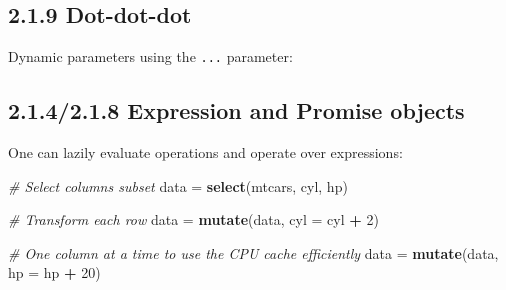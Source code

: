 \documentclass[]{article}
\newenvironment{Shaded}{\begin{snugshade}}{\end{snugshade}}
\newcommand{\CommentTok}[1]{\textcolor[rgb]{0.56,0.35,0.01}{\textit{#1}}}
\newcommand{\DataTypeTok}[1]{\textcolor[rgb]{0.13,0.29,0.53}{#1}}
\newcommand{\DecValTok}[1]{\textcolor[rgb]{0.00,0.00,0.81}{#1}}
\newcommand{\KeywordTok}[1]{\textcolor[rgb]{0.13,0.29,0.53}{\textbf{#1}}}
\newcommand{\NormalTok}[1]{#1}
\newcommand{\OperatorTok}[1]{\textcolor[rgb]{0.81,0.36,0.00}{\textbf{#1}}}
\newcommand{\StringTok}[1]{\textcolor[rgb]{0.31,0.60,0.02}{#1}}
\begin{document}
\hypertarget{dot-dot-dot}{%
\subsection{2.1.9 Dot-dot-dot}\label{dot-dot-dot}}

Dynamic parameters using the \texttt{...} parameter:

\begin{Shaded}
\end{Shaded}

\hypertarget{expression-and-promise-objects}{%
\subsection{2.1.4/2.1.8 Expression and Promise
objects}\label{expression-and-promise-objects}}

One can lazily evaluate operations and operate over expressions:

\begin{Shaded}
\begin{Highlighting}[]
\CommentTok{# Select columns subset}
\NormalTok{data =}\StringTok{ }\KeywordTok{select}\NormalTok{(mtcars, cyl, hp)}

\CommentTok{# Transform each row}
\NormalTok{data =}\StringTok{ }\KeywordTok{mutate}\NormalTok{(data, }\DataTypeTok{cyl =}\NormalTok{ cyl }\OperatorTok{+}\StringTok{ }\DecValTok{2}\NormalTok{)}

\CommentTok{# One column at a time to use the CPU cache efficiently}
\NormalTok{data =}\StringTok{ }\KeywordTok{mutate}\NormalTok{(data, }\DataTypeTok{hp =}\NormalTok{ hp }\OperatorTok{+}\StringTok{ }\DecValTok{20}\NormalTok{)}
\end{Highlighting}
\end{Shaded}
\end{document}
